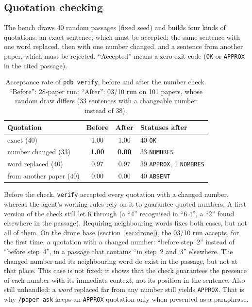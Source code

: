 \documentclass[11pt,a4paper]{article}
\newcommand{\cmd}[1]{\texttt{#1}}
\begin{document}
\subsection{Quotation checking}
\label{sec:evalverify}

The bench draws 40 random passages (fixed seed) and builds four kinds of quotations: an
exact sentence, which must be accepted; the same sentence with one word replaced, then with
one number changed, and a sentence from another paper, which must be rejected. ``Accepted''
means a zero exit code (\cmd{OK} or \cmd{APPROX} in the cited passage).

\begin{table}[ht]
\centering
\caption{Acceptance rate of \cmd{pdb verify}, before and after the number check. ``Before'':
28-paper run; ``After'': 03/10 run on 101 papers, whose random draw differs (33 sentences
with a changeable number instead of 38).}
\label{tab:verify}
\small
\begin{tabular}{@{}lccl@{}}
\toprule
Quotation & Before & After & Statuses after \\
\midrule
exact (40)             & 1.00 & 1.00 & 40 \cmd{OK} \\
number changed (33)    & \textbf{1.00} & \textbf{0.00} & 33 \cmd{NOMBRES} \\
word replaced (40)     & 0.97 & 0.97 & 39 \cmd{APPROX}, 1 \cmd{NOMBRES} \\
from another paper (40) & 0.00 & 0.00 & 40 \cmd{ABSENT} \\
\bottomrule
\end{tabular}
\end{table}

Before the check, \cmd{verify} accepted every quotation with a changed number, whereas the
agent's working rules rely on it to guarantee quoted numbers. A first version of the check
still let 6 through (a ``4'' recognised in ``6.4'', a ``2'' found elsewhere in the passage).
Requiring neighbouring words fixes both cases, but not all of them. On the drone base
(section~\ref{sec:drone}), the 03/10 run accepts, for the first time, a quotation with a
changed number: ``before step~2'' instead of ``before step~4'', in a passage that contains
``in step~2 and~3'' elsewhere. The changed number and its neighbouring word do exist in the
passage, but not at that place. This case is not fixed; it shows that the check guarantees
the presence of each number with its immediate context, not its position in the sentence.
Also still unhandled: a \emph{word} replaced far from any number still yields \cmd{APPROX}.
That is why \cmd{/paper-ask} keeps an \cmd{APPROX} quotation only when presented as a
paraphrase.
\end{document}
